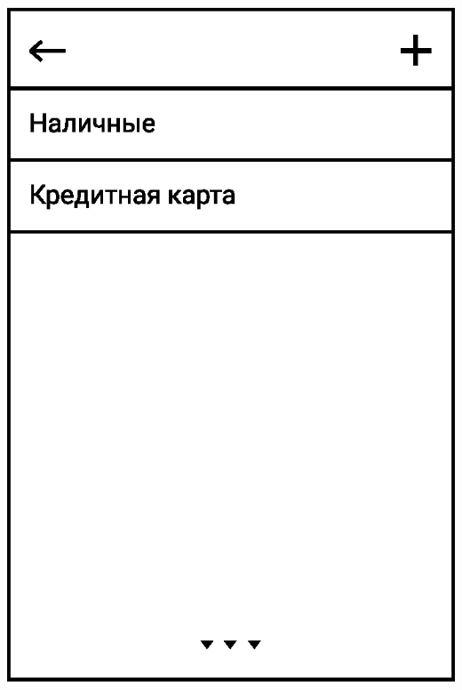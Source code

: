 \documentclass[russian,utf8,a1paper,nostitching,simple]{eskdgraph}
\begin{document}
\begin{ESKDdrawing}
\begin{minipage}{28cm}
\begin{minipage}{7.5cm}
      \vspace{1cm}
      \centering
      \includegraphics[width=\linewidth]{fig/ui_activities_accounts_view.eps}


\end{minipage}
\end{minipage}
\end{ESKDdrawing}
\end{document}

